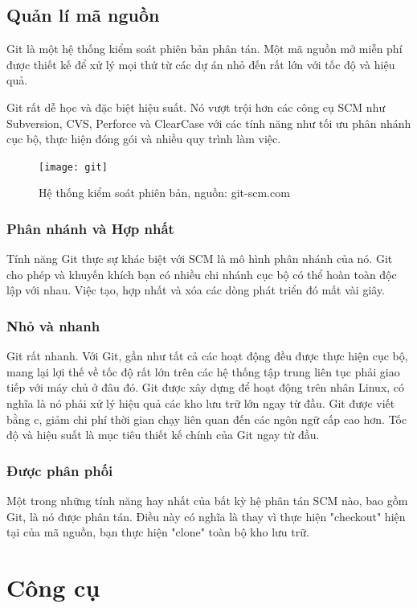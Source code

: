 {{\subsection{Quản lí mã nguồn}

Git là một hệ thống kiểm soát phiên bản phân tán. Một mã nguồn mở miễn phí được thiết kế để xử lý mọi thứ từ các dự án nhỏ đến rất lớn với tốc độ và hiệu quả.

Git rất dễ học và đặc biệt hiệu suất. Nó vượt trội hơn các công cụ SCM như Subversion, CVS, Perforce và ClearCase với các tính năng như tối ưu phân nhánh cục bộ, thực hiện đóng gói và nhiều quy trình làm việc.

\begin{figure}[h]
	\caption{Hệ thống kiểm soát phiên bản, nguồn: git-scm.com}
	\centering
	\texttt{[image: git]}
	\label{fig:ill:git}
\end{figure}

\subsubsection{Phân nhánh và Hợp nhất}
Tính năng Git thực sự khác biệt với SCM là mô hình phân nhánh của nó.
Git cho phép và khuyến khích bạn có nhiều chi nhánh cục bộ có thể hoàn toàn độc lập với nhau. Việc tạo, hợp nhất và xóa các dòng phát triển đó mất vài giây.

\subsubsection{Nhỏ và nhanh}
Git rất nhanh. Với Git, gần như tất cả các hoạt động đều được thực hiện cục bộ, mang lại lợi thế về tốc độ rất lớn trên các hệ thống tập trung liên tục phải giao tiếp với máy chủ ở đâu đó.
Git được xây dựng để hoạt động trên nhân Linux, có nghĩa là nó phải xử lý hiệu quả các kho lưu trữ lớn ngay từ đầu. Git được viết bằng \acrshort{c}, giảm chi phí thời gian chạy liên quan đến các ngôn ngữ cấp cao hơn. Tốc độ và hiệu suất là mục tiêu thiết kế chính của Git ngay từ đầu.

\subsubsection{Được phân phối}
Một trong những tính năng hay nhất của bất kỳ hệ phân tán SCM nào, bao gồm Git, là nó được phân tán. Điều này có nghĩa là thay vì thực hiện "checkout" hiện tại của mã nguồn, bạn thực hiện "clone" toàn bộ kho lưu trữ.

\section{Công cụ}

}}
